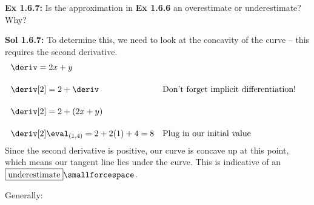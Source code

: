 \begin{tcolorbox}[example]
    \textbf{Ex 1.6.7: } Is the approximation in \textbf{Ex 1.6.6} an overestimate or underestimate? Why?
\end{tcolorbox}
\begin{tcolorbox}[solution]
    \textbf{Sol 1.6.7: } To determine this, we need to look at the concavity of the curve -- this requires the second derivative. \begin{align*}
        & \deriv = 2x + y \\[11pt]
        & \deriv[2] = 2 + \deriv && \text{Don't forget implicit differentiation!} \\[11pt]
        & \deriv[2] = 2 + (2x + y) \\[11pt]
        & \deriv[2] \eval_{(1, 4)} = 2 + 2(1) + 4 = 8 && \text{Plug in our initial value}
    \end{align*}
    Since the second derivative is positive, our curve is concave up at this point, which means our tangent line lies under the curve. This is indicative of an $\boxed{\text{underestimate}} \smallforcespace$.
\end{tcolorbox}

Generally: \par

\begin{center}
\end{center}

